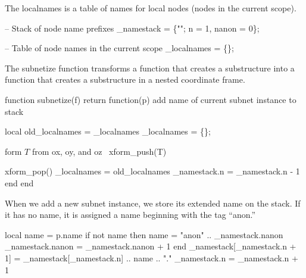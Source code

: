 The {\Tt{}localnames\nwendquote} is a table of names for local nodes (nodes in the current
scope).

\nwenddocs{}\endmoddef\nwstartdeflinemarkup{}\nwenddeflinemarkup
-- Stack of node name prefixes
_namestack = \{""; n = 1, nanon = 0\};

-- Table of node names in the current scope
_localnames = \{\};

\nwendcode{}\nwdocspar

The {\Tt{}subnetize\nwendquote} function transforms a function that creates a substructure
into a function that creates a substructure in a nested coordinate frame.

\nwenddocs{}\endmoddef\nwstartdeflinemarkup{}\nwenddeflinemarkup
function subnetize(f)
  return function(p)
    \LA{}add name of current subnet instance to stack~{\nwtagstyle{}}\RA{}

    local old_localnames = _localnames
    _localnames = \{\};

    \LA{}form $T$ from \code{}ox\edoc{}, \code{}oy\edoc{}, and \code{}oz\edoc{}~{\nwtagstyle{}}\RA{}
    xform_push(T)


    xform_pop()
    _localnames = old_localnames
    _namestack.n = _namestack.n - 1
  end
end

\nwendcode{}\nwdocspar

When we add a new subnet instance, we store its extended name on
the stack.  If it has no name, it is assigned a name beginning
with the tag ``anon.''

\nwenddocs{}\endmoddef\nwstartdeflinemarkup{}\nwenddeflinemarkup
local name = p.name
if not name then
  name = "anon" .. _namestack.nanon
  _namestack.nanon = _namestack.nanon + 1
end
_namestack[_namestack.n + 1] = _namestack[_namestack.n] .. name .. "."
_namestack.n = _namestack.n + 1

